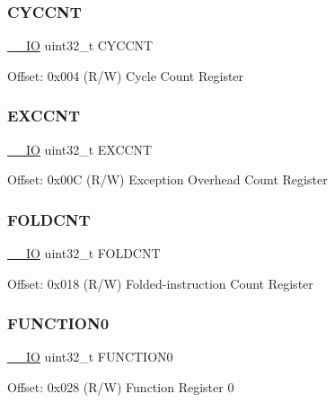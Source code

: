 \subsubsection{\texorpdfstring{CYCCNT}{CYCCNT}}
{\footnotesize\ttfamily \mbox{\hyperlink{core__sc300_8h_aec43007d9998a0a0e01faede4133d6be}{\+\_\+\+\_\+\+IO}} uint32\+\_\+t C\+Y\+C\+C\+NT}

Offset\+: 0x004 (R/W) Cycle Count Register \mbox{\label{struct_d_w_t___type_ae6edad4ef9f92b3ce206dac61621871a}} 
\subsubsection{\texorpdfstring{EXCCNT}{EXCCNT}}
{\footnotesize\ttfamily \mbox{\hyperlink{core__sc300_8h_aec43007d9998a0a0e01faede4133d6be}{\+\_\+\+\_\+\+IO}} uint32\+\_\+t E\+X\+C\+C\+NT}

Offset\+: 0x00C (R/W) Exception Overhead Count Register \mbox{\label{struct_d_w_t___type_a11e6aebbf2c7bedc29059ff023891b82}} 
\subsubsection{\texorpdfstring{FOLDCNT}{FOLDCNT}}
{\footnotesize\ttfamily \mbox{\hyperlink{core__sc300_8h_aec43007d9998a0a0e01faede4133d6be}{\+\_\+\+\_\+\+IO}} uint32\+\_\+t F\+O\+L\+D\+C\+NT}

Offset\+: 0x018 (R/W) Folded-\/instruction Count Register \mbox{\label{struct_d_w_t___type_a7eb6189fbcdf2ad9d0d28dad691f3fe8}} 
\subsubsection{\texorpdfstring{FUNCTION0}{FUNCTION0}}
{\footnotesize\ttfamily \mbox{\hyperlink{core__sc300_8h_aec43007d9998a0a0e01faede4133d6be}{\+\_\+\+\_\+\+IO}} uint32\+\_\+t F\+U\+N\+C\+T\+I\+O\+N0}

Offset\+: 0x028 (R/W) Function Register 0 \mbox{\label{struct_d_w_t___type_afbea004f9e2860b9f450bcea21eec318}} 

